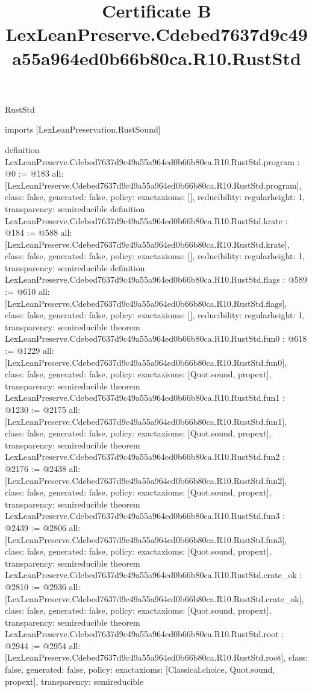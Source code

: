 \begin{lexlean}{RustStd}
\title{Certificate B LexLeanPreserve.Cdebed7637d9c49a55a964ed0b66b80ca.R10.RustStd}
\begin{coremodule}
imports [LexLeanPreservation.RustSound]

definition LexLeanPreserve.Cdebed7637d9c49a55a964ed0b66b80ca.R10.RustStd.program : @0 := @183 {
  all: [LexLeanPreserve.Cdebed7637d9c49a55a964ed0b66b80ca.R10.RustStd.program],
  class: false,
  generated: false,
  policy: exact{axioms: []},
  reducibility: regular{height: 1},
  transparency: semireducible
}
definition LexLeanPreserve.Cdebed7637d9c49a55a964ed0b66b80ca.R10.RustStd.krate : @184 := @588 {
  all: [LexLeanPreserve.Cdebed7637d9c49a55a964ed0b66b80ca.R10.RustStd.krate],
  class: false,
  generated: false,
  policy: exact{axioms: []},
  reducibility: regular{height: 1},
  transparency: semireducible
}
definition LexLeanPreserve.Cdebed7637d9c49a55a964ed0b66b80ca.R10.RustStd.flags : @589 := @610 {
  all: [LexLeanPreserve.Cdebed7637d9c49a55a964ed0b66b80ca.R10.RustStd.flags],
  class: false,
  generated: false,
  policy: exact{axioms: []},
  reducibility: regular{height: 1},
  transparency: semireducible
}
theorem LexLeanPreserve.Cdebed7637d9c49a55a964ed0b66b80ca.R10.RustStd.fun0 : @618 := @1229 {
  all: [LexLeanPreserve.Cdebed7637d9c49a55a964ed0b66b80ca.R10.RustStd.fun0],
  class: false,
  generated: false,
  policy: exact{axioms: [Quot.sound, propext]},
  transparency: semireducible
}
theorem LexLeanPreserve.Cdebed7637d9c49a55a964ed0b66b80ca.R10.RustStd.fun1 : @1230 := @2175 {
  all: [LexLeanPreserve.Cdebed7637d9c49a55a964ed0b66b80ca.R10.RustStd.fun1],
  class: false,
  generated: false,
  policy: exact{axioms: [Quot.sound, propext]},
  transparency: semireducible
}
theorem LexLeanPreserve.Cdebed7637d9c49a55a964ed0b66b80ca.R10.RustStd.fun2 : @2176 := @2438 {
  all: [LexLeanPreserve.Cdebed7637d9c49a55a964ed0b66b80ca.R10.RustStd.fun2],
  class: false,
  generated: false,
  policy: exact{axioms: [Quot.sound, propext]},
  transparency: semireducible
}
theorem LexLeanPreserve.Cdebed7637d9c49a55a964ed0b66b80ca.R10.RustStd.fun3 : @2439 := @2806 {
  all: [LexLeanPreserve.Cdebed7637d9c49a55a964ed0b66b80ca.R10.RustStd.fun3],
  class: false,
  generated: false,
  policy: exact{axioms: [Quot.sound, propext]},
  transparency: semireducible
}
theorem LexLeanPreserve.Cdebed7637d9c49a55a964ed0b66b80ca.R10.RustStd.crate_ok : @2810 := @2936 {
  all: [LexLeanPreserve.Cdebed7637d9c49a55a964ed0b66b80ca.R10.RustStd.crate_ok],
  class: false,
  generated: false,
  policy: exact{axioms: [Quot.sound, propext]},
  transparency: semireducible
}
theorem LexLeanPreserve.Cdebed7637d9c49a55a964ed0b66b80ca.R10.RustStd.root : @2944 := @2954 {
  all: [LexLeanPreserve.Cdebed7637d9c49a55a964ed0b66b80ca.R10.RustStd.root],
  class: false,
  generated: false,
  policy: exact{axioms: [Classical.choice, Quot.sound, propext]},
  transparency: semireducible
}


\end{coremodule}
\end{lexlean}
